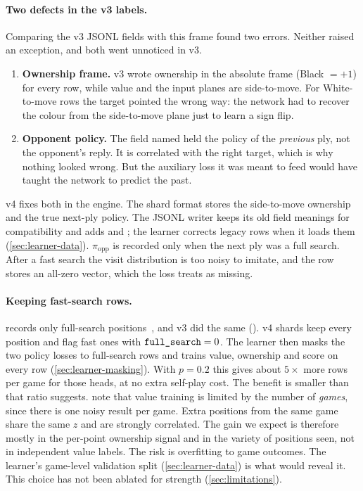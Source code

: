 \paragraph{Two defects in the v3 labels.}
Comparing the v3 JSONL fields with this frame found two errors. Neither raised an
exception, and both went unnoticed in v3.
\begin{enumerate}
  \item \textbf{Ownership frame.} v3 wrote ownership in the absolute frame (Black $=+1$)
        for every row, while value and the input planes are side-to-move. For
        White-to-move rows the target pointed the wrong way: the network had to recover
        the colour from the side-to-move plane just to learn a sign flip.
  \item \textbf{Opponent policy.} The field named  held the policy of
        the \emph{previous} ply, not the opponent's reply. It is correlated with the
        right target, which is why nothing looked wrong. But the auxiliary loss it was
        meant to feed would have taught the network to predict the past.
\end{enumerate}
v4 fixes both in the engine. The shard format
stores the side-to-move ownership and the true next-ply policy. The JSONL writer keeps
its old field meanings for compatibility and adds  and
; the learner corrects legacy rows when it loads them
(\cref{sec:learner-data}). $\pi_{\mathrm{opp}}$ is recorded only when the next ply was a
full search. After a fast search the visit distribution is too noisy to imitate, and the
row stores an all-zero vector, which the loss treats as missing.

\paragraph{Keeping fast-search rows.}
\katago{} records only full-search positions~\citep[\S3.1]{wu2019accelerating}, and v3 did
the same (). v4 shards keep every position and flag fast ones with
$\texttt{full\_search}=0$. The learner then masks the two policy losses to full-search rows
and trains value, ownership and score on every row (\cref{sec:learner-masking}). With
$p=0.2$ this gives about $5\times$ more rows per game for those heads, at no extra
self-play cost. The benefit is smaller than that ratio suggests. \citet{wu2019accelerating}
note that value training is limited by the number of \emph{games}, since there is one
noisy result per game. Extra positions from the same game share the same $z$ and are
strongly correlated. The gain we expect is therefore mostly in the per-point ownership
signal and in the variety of positions seen, not in independent value labels. The risk
is overfitting to game outcomes. The learner's game-level validation split
(\cref{sec:learner-data}) is what would reveal it. This choice has not been ablated for
strength (\cref{sec:limitations}).

